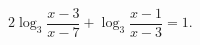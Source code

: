 \begin{ex}[type=equation]
	\begin{condition}
		$2\log_3 \dfrac{x - 3}{x - 7} + \log_3 \dfrac{x - 1}{x - 3} = 1.$
	\end{condition}
\end{ex}